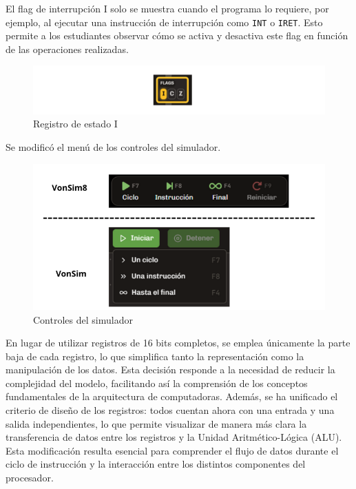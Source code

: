 \documentclass[12pt,oneside]{templates/unerthesis}
\begin{document}
El flag de interrupción I solo se muestra cuando el programa lo requiere, por ejemplo, al ejecutar una instrucción de interrupción como \texttt{INT} o \texttt{IRET}. Esto permite a los estudiantes observar cómo se activa y desactiva este flag en función de las operaciones realizadas.

\begin{figure}

{\centering \includegraphics[width=1\linewidth]{images/flagi} 

}

\caption{Registro de estado I}\label{fig:banderaI}
\end{figure}

Se modificó el menú de los controles del simulador.

\begin{figure}

{\centering \includegraphics[width=1\linewidth]{images/controles} 

}

\caption{Controles del simulador}\label{fig:controles}
\end{figure}

En lugar de utilizar registros de 16 bits completos, se emplea únicamente la parte baja de cada registro, lo que simplifica tanto la representación como la manipulación de los datos. Esta decisión responde a la necesidad de reducir la complejidad del modelo, facilitando así la comprensión de los conceptos fundamentales de la arquitectura de computadoras. Además, se ha unificado el criterio de diseño de los registros: todos cuentan ahora con una entrada y una salida independientes, lo que permite visualizar de manera más clara la transferencia de datos entre los registros y la Unidad Aritmético-Lógica (ALU). Esta modificación resulta esencial para comprender el flujo de datos durante el ciclo de instrucción y la interacción entre los distintos componentes del procesador.
\end{document}
